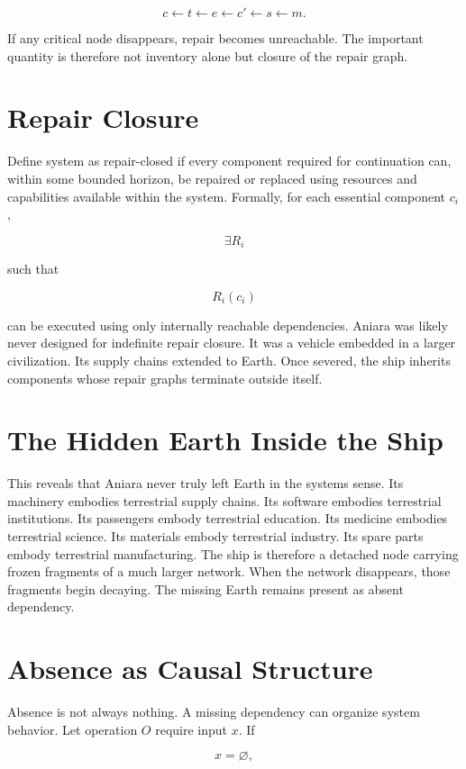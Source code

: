 \documentclass[11pt,oneside]{book}
\theoremstyle{definition}
\theoremstyle{remark}
\begin{document}
\[
c \leftarrow t \leftarrow e \leftarrow c' \leftarrow s \leftarrow m.
\]

If any critical node disappears, repair becomes unreachable. The important quantity is therefore not
inventory alone but closure of the repair graph.

\section{Repair Closure}

Define system as repair-closed if every component required for continuation can, within some bounded
horizon, be repaired or replaced using resources and capabilities available within the system.
Formally, for each essential component \(c_i\),

\[
\exists R_i
\]

such that

\[
R_i(c_i)
\]

can be executed using only internally reachable dependencies. Aniara was likely never designed for
indefinite repair closure. It was a vehicle embedded in a larger civilization. Its supply chains
extended to Earth. Once severed, the ship inherits components whose repair graphs terminate outside
itself.

\section{The Hidden Earth Inside the Ship}

This reveals that Aniara never truly left Earth in the systems sense. Its machinery embodies
terrestrial supply chains. Its software embodies terrestrial institutions. Its passengers embody
terrestrial education. Its medicine embodies terrestrial science. Its materials embody terrestrial
industry. Its spare parts embody terrestrial manufacturing. The ship is therefore a detached node
carrying frozen fragments of a much larger network. When the network disappears, those fragments
begin decaying. The missing Earth remains present as absent dependency.

\section{Absence as Causal Structure}

Absence is not always nothing. A missing dependency can organize system behavior. Let operation
\(O\) require input \(x\). If

\[
x=\varnothing,
\]
\end{document}
